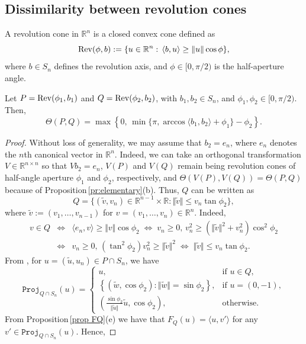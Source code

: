 \documentclass[hidelinks,onefignum,onetabnum]{siamart250211}
\theoremstyle{definition}
\theoremstyle{remark}
\newcommand{\R}{\mathbb R}
\newcommand{\tu}{\tilde{u}}
\newcommand{\tv}{\tilde{v}}
\newcommand{\proj}{\mathtt{Proj}}
\begin{document}
\subsection{Dissimilarity between revolution cones}\label{Sec:revolution}
A revolution cone in $\R^n$ is a closed convex cone defined as
\[{\rm Rev}(\phi,b):=\{u\in\R^n:\,\langle b,u\rangle\geq\Vert u\Vert\cos\phi\},\]
where $b\in S_n$ defines the revolution axis, and $\phi\in[0,\pi/2)$ is the half-aperture angle.
\begin{theorem}\label{th:rev}
Let $P={\rm Rev}(\phi_1,b_1)$ and $Q={\rm Rev}(\phi_2,b_2)$, with $b_1,b_2\in S_n$, and $\phi_1,\phi_2\in[0,\pi/2)$. Then,
\[\Theta(P,Q)=\max\left\{0,\,\min\{\pi, \arccos\langle b_1,b_2\rangle +\phi_1\}-\phi_2\right\}.\]
\end{theorem}
\begin{proof}
Without loss of generality, we may assume that $b_2=e_n$, where $e_n$ denotes the $n$th canonical vector in $\R^n$. Indeed, we can take an orthogonal transformation $V\in\R^{n\times n}$ so that $Vb_2=e_n$, $V(P)$ and $V(Q)$ remain being revolution cones of half-angle aperture $\phi_1$ and $\phi_2$, respectively, and $\Theta(V(P),V(Q))=\Theta(P,Q)$ because of Proposition\,\ref{pr:elementary}(b). Thus, $Q$ can be written as 
\[Q=\{(\tv,v_n)\in\R^{n-1}\times\R:\Vert\tv\Vert\leq v_n\tan\phi_2\},\]
where $\tilde v:=(v_1,\ldots,v_{n-1})$ for $v=(v_1,\ldots,v_n)\in\R^n$. Indeed,
\begin{eqnarray*}
v\in Q  &\Leftrightarrow&  \langle e_n,v\rangle\geq\Vert v\Vert\cos\phi_2 \; \Leftrightarrow \;v_n\geq 0,\, v_n^2\geq (\Vert \tilde v\Vert^2+v_n^2)\cos^2\phi_2 \\
&\Leftrightarrow  &v_n\geq 0,\,(\tan^2\phi_2)v_n^2\geq \Vert \tilde v\Vert^2\; \Leftrightarrow \;\Vert\tv\Vert\leq v_n\tan\phi_2.
\end{eqnarray*}
%
From \cite[Example\,9.1]{Bauschke}, for $u=(\tilde u,u_n)\in P\cap S_n$, we have
\begin{equation}\label{proj:rev}
\proj_{Q\cap S_n}(u)=\begin{cases}
u,&\text{if }u\in Q,\\
\left\{(\tilde w,\cos\phi_2):\Vert\tilde w\Vert=\sin\phi_2\right\},&\text{if }u=(0,-1),\\
\left(\frac{\sin\phi_2}{\Vert\tu\Vert}\tu,\cos\phi_2\right),&\text{otherwise}.
\end{cases}
\end{equation}
From Proposition\,\ref{prop FQ}(e) we have that $F_Q(u)=\langle u,v'\rangle$ for any $v'\in\proj_{Q\cap S_n}(u)$. Hence,

\end{proof}
\end{document}

